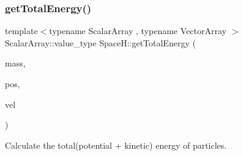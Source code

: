 \subsubsection{\texorpdfstring{get\+Total\+Energy()}{getTotalEnergy()}}
{\footnotesize\ttfamily template$<$typename Scalar\+Array , typename Vector\+Array $>$ \\
Scalar\+Array\+::value\+\_\+type Space\+H\+::get\+Total\+Energy (\begin{DoxyParamCaption}\item[{const Scalar\+Array \&}]{mass,  }\item[{const Vector\+Array \&}]{pos,  }\item[{const Vector\+Array \&}]{vel }\end{DoxyParamCaption})\hspace{0.3cm}{\ttfamily [inline]}}



Calculate the total(potential + kinetic) energy of particles. 


